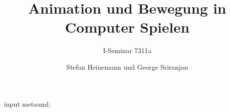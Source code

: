 \documentclass[oneside,DIV12,BCOR0.5cm,bibliography=totoc]{template}
\begin{document}
\begin{empfile}
\begin{empcmds}
input metauml;
\end{empcmds}


\title{Animation und Bewegung in Computer Spielen}
\subtitle{I-Seminar 7311a}

\author{Stefan Heinemann und George Sriranjan}

\maketitle



\tableofcontents









\end{empfile}
\end{document}
